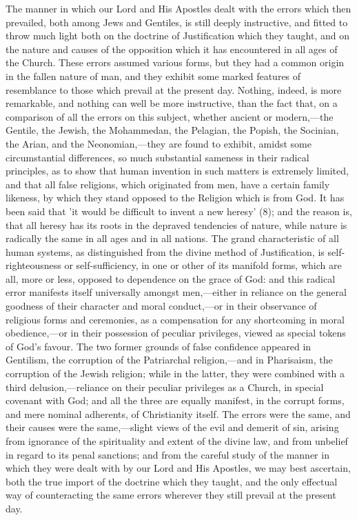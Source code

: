 \documentclass[
]{book}
\begin{document}
The manner in which our Lord and His Apostles dealt with the errors which then prevailed, both among Jews and Gentiles, is still deeply instructive, and fitted to throw much light both on the doctrine of Justification which they taught, and on the nature and causes of the opposition which it has encountered in all ages of the Church. These errors assumed various forms, but they had a common origin in the fallen nature of man, and they exhibit some marked features of resemblance to those which prevail at the present day. Nothing, indeed, is more remarkable, and nothing can well be more instructive, than the fact that, on a comparison of all the errors on this subject, whether ancient or modern,---the Gentile, the Jewish, the Mohammedan, the Pelagian, the Popish, the Socinian, the Arian, and the Neonomian,---they are found to exhibit, amidst some circumstantial differences, so much substantial sameness in their radical principles, as to show that human invention in such matters is extremely limited, and that all false religions, which originated from men, have a certain family likeness, by which they stand opposed to the Religion which is from God. It has been said that 'it would be difficult to invent a new heresy' (8); and the reason is, that all heresy has its roots in the depraved tendencies of nature, while nature is radically the same in all ages and in all nations. The grand characteristic of all human systems, as distinguished from the divine method of Justification, is self-righteousness or self-sufficiency, in one or other of its manifold forms, which are all, more or less, opposed to dependence on the grace of God: and this radical error manifests itself universally amongst men,---either in reliance on the general goodness of their character and moral conduct,---or in their observance of religious forms and ceremonies, as a compensation for any shortcoming in moral obedience,---or in their possession of peculiar privileges, viewed as special tokens of God's favour. The two former grounds of false confidence appeared in Gentilism, the corruption of the Patriarchal religion,---and in Pharisaism, the corruption of the Jewish religion; while in the latter, they were combined with a third delusion,---reliance on their peculiar privileges as a Church, in special covenant with God; and all the three are equally manifest, in the corrupt forms, and mere nominal adherents, of Christianity itself. The errors were the same, and their causes were the same,---slight views of the evil and demerit of sin, arising from ignorance of the spirituality and extent of the divine law, and from unbelief in regard to its penal sanctions; and from the careful study of the manner in which they were dealt with by our Lord and His Apostles, we may best ascertain, both the true import of the doctrine which they taught, and the only effectual way of counteracting the same errors wherever they still prevail at the present day.
\end{document}
